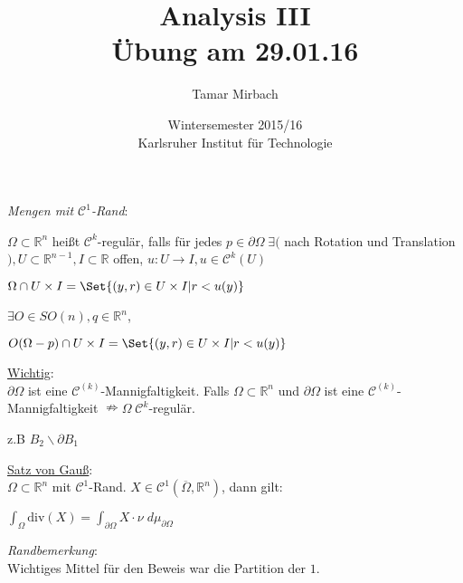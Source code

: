 \documentclass[11pt]{memoir}
\begin{document}
\title{\textbf{Analysis III}\\ Übung am 29.01.16}
\author{Tamar Mirbach}
\date{Wintersemester 2015/16\\ Karlsruher Institut für Technologie}

\maketitle


\emph{Mengen mit $\mathscr C^1$-Rand}: 
\par
$\Omega \subset \mathbb R^n$ heißt $\mathscr C^k$-regulär, falls für jedes $p \in \partial\Omega \; \exists ($ nach Rotation und Translation$), U \subset \mathbb R^{n-1}, I \subset \mathbb R$ offen, $u: U \rightarrow I, u \in \mathscr C^k (U)$ 
\begin{center}
	$\Omega \cap U \times I = \Set{(y,r) \in U \times I | r < u(y)}$
\end{center}

$\exists O \in SO(n), q \in \mathbb R^n$, 
\begin{center}
	$O(\Omega - p) \cap U \times I = \Set{(y,r) \in U \times I | r < u(y)}$
\end{center}

\par

\underline{Wichtig}: \\
$\partial\Omega$ ist eine $\mathscr C^{(k)}$-Mannigfaltigkeit. Falls $\Omega \subset \mathbb R^n$ und $\partial\Omega$ ist eine $\mathscr C^{(k)}$-Mannigfaltigkeit $\nRightarrow \Omega \; \mathscr C^k$-regulär.

\par

z.B $B_2\backslash \partial B_1$

\par

\underline{Satz von Gauß}: \\
$\Omega \subset \mathbb R^n$ mit $\mathscr C^1$-Rand. $X \in \mathscr C^1(\overline{\Omega}, \mathbb R^n)$, dann gilt:
\begin{center}
	$\int_\Omega \text{div} (X)  = \int_{\partial\Omega} X\cdotp \nu \;d\mu_{\partial\Omega}$
\end{center}

\par

\emph{Randbemerkung}: \\
Wichtiges Mittel für den Beweis war die Partition der $1$.
\end{document}
